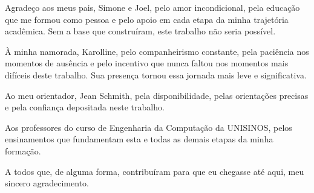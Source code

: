 
\imprimircapa

\imprimirfolhaderosto



\begin{agradecimentos}
Agradeço aos meus pais, Simone e Joel, pelo amor incondicional, pela educação que me
formou como pessoa e pelo apoio em cada etapa da minha trajetória acadêmica. Sem a base
que construíram, este trabalho não seria possível.

À minha namorada, Karolline, pelo companheirismo constante, pela paciência nos momentos
de ausência e pelo incentivo que nunca faltou nos momentos mais difíceis deste trabalho.
Sua presença tornou essa jornada mais leve e significativa.

Ao meu orientador, Jean Schmith, pela disponibilidade, pelas orientações precisas e pela confiança
depositada neste trabalho.

Aos professores do curso de Engenharia da Computação da UNISINOS, pelos ensinamentos que
fundamentam esta e todas as demais etapas da minha formação.

A todos que, de alguma forma, contribuíram para que eu chegasse até aqui, meu sincero
agradecimento.
\end{agradecimentos}



